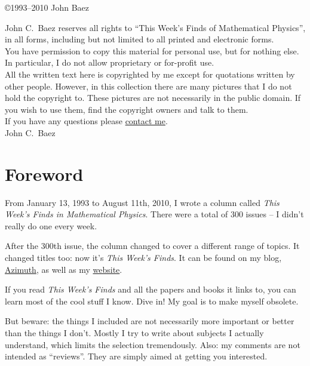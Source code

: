 \maketitle

\begin{center}\copyright 1993--2010 John Baez\end{center}

John C.\ Baez reserves all rights to ``This Week's Finds of Mathematical 
Physics'', in all forms, including but not limited to all printed and 
electronic forms.  
\\[2ex]
You have permission to copy this material for personal use, but for
nothing else.  In particular, I do not allow proprietary or for-profit 
use.
\\[2ex]
All the written text here is copyrighted by me except for quotations
written by other people.   However, in this collection there are many 
pictures that I do not hold the copyright to.  These pictures are not 
necessarily in the public domain.  If you wish to use them, find the
copyright owners and talk to them.
\\[2ex]
If you have any questions please \href{mailto:baez@math.removethis.ucr.andthis.edu}{contact me}.  
\\[8ex]
John C.\ Baez
\newpage
\section*{Foreword}
From January 13, 1993 to August 11th, 2010, I wrote a column called \emph{This Week's Finds in Mathematical Physics}. There were a total of 300 issues -- I didn't really do one every week.

After the 300th issue, the column changed to cover a different range of topics. It changed titles too: now it's \emph{This Week's Finds}. It can be found on my blog, \href{http://johncarlosbaez.wordpress.com/}{Azimuth}, as well as my \href{http://math.ucr.edu/home/baez/TWF.html}{website}.

If you read \emph{This Week's Finds} and all the papers and books it links to, you can learn most of the cool stuff I know. Dive in! My goal is to make myself obsolete.

But beware: the things I included are not necessarily more important or better than the things I don't. Mostly I try to write about subjects I actually understand, which limits the selection tremendously. Also: my comments are not intended as ``reviews''. They are simply aimed at getting you interested.

